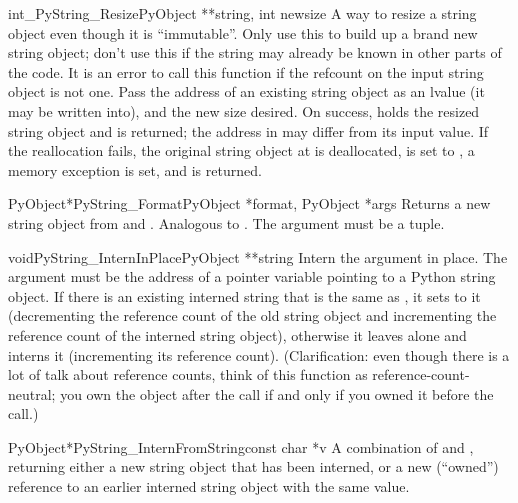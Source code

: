 \begin{cfuncdesc}{int}{_PyString_Resize}{PyObject **string, int newsize}
  A way to resize a string object even though it is ``immutable''.
  Only use this to build up a brand new string object; don't use this
  if the string may already be known in other parts of the code.  It
  is an error to call this function if the refcount on the input string
  object is not one.
  Pass the address of an existing string object as an lvalue (it may
  be written into), and the new size desired.  On success, 
  holds the resized string object and  is returned; the address in
   may differ from its input value.  If the
  reallocation fails, the original string object at  is
  deallocated,  is set to \NULL{}, a memory exception is set,
  and  is returned.
\end{cfuncdesc}

\begin{cfuncdesc}{PyObject*}{PyString_Format}{PyObject *format,
                                              PyObject *args}
  Returns a new string object from  and .
  Analogous to .  The 
  argument must be a tuple.
\end{cfuncdesc}

\begin{cfuncdesc}{void}{PyString_InternInPlace}{PyObject **string}
  Intern the argument  in place.  The argument must be
  the address of a pointer variable pointing to a Python string
  object.  If there is an existing interned string that is the same as
  , it sets  to it (decrementing the
  reference count of the old string object and incrementing the
  reference count of the interned string object), otherwise it leaves
   alone and interns it (incrementing its reference
  count).  (Clarification: even though there is a lot of talk about
  reference counts, think of this function as reference-count-neutral;
  you own the object after the call if and only if you owned it before
  the call.)
\end{cfuncdesc}

\begin{cfuncdesc}{PyObject*}{PyString_InternFromString}{const char *v}
  A combination of  and
  , returning either a new string
  object that has been interned, or a new (``owned'') reference to an
  earlier interned string object with the same value.
\end{cfuncdesc}

